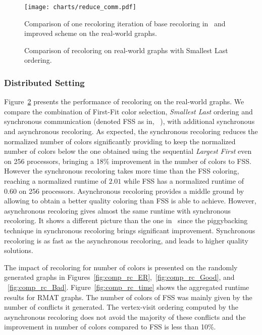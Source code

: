 \documentclass{article}
\begin{document}
\begin{figure}
  \centering
  \texttt{[image: charts/reduce\_comm.pdf]}
  \caption{Comparison of one recoloring iteration of base recoloring in~\cite{HiPC11} and improved scheme on the real-world graphs.}
  \label{fig:reduced_comm}
\end{figure}



\begin{figure}
  \centering
  \caption{Comparison of recoloring on real-world graphs with Smallest Last ordering.}
  \label{fig:comp_recolor_real}
\end{figure}

\subsubsection{Distributed Setting}
\label{sec:dist}

Figure~\ref{fig:comp_recolor_real} presents the performance of
recoloring on the real-world graphs. We compare the combination of First-Fit color selection,
{\em Smallest Last} ordering and synchronous communication (denoted FSS as in, ~\cite{HiPC11}), with
additional synchronous and asynchronous recoloring.
As expected, the synchronous
recoloring reduces the normalized number of colors significantly
providing to keep the normalized number of colors below the one
obtained using the sequential {\em Largest First} even on 256 processors,
bringing a 18\% improvement in the number of colors to FSS. However the synchronous recoloring takes more
time than the FSS coloring, reaching a normalized runtime of
$2.01$ while FSS has a normalized runtime of $0.60$ on 256 processors. 
Asynchronous recoloring provides a middle ground by
allowing to obtain a better quality coloring than FSS is able to
achieve. However, asynchronous recoloring gives almost the same runtime
with synchronous recoloring. It shows a different picture than the one 
in~\cite{HiPC11} since the piggybacking technique in synchronous recoloring brings significant improvement.
Synchronous recoloring is as fast as the asynchronous recoloring,
and leads to higher quality solutions.

The impact of recoloring for number of colors is presented on the randomly generated graphs
in Figures~\ref{fig:comp_rc_ER},~\ref{fig:comp_rc_Good}, and ~\ref{fig:comp_rc_Bad}.
Figure~\ref{fig:comp_rc_time} shows the aggregated runtime results for RMAT graphs.
The number of colors of FSS was mainly given by the number of conflicts it
generated. The vertex-visit ordering computed by the asynchronous
recoloring does not avoid the majority of these conflicts and the
improvement in number of colors compared to FSS is less than 10\%.
\end{document}
